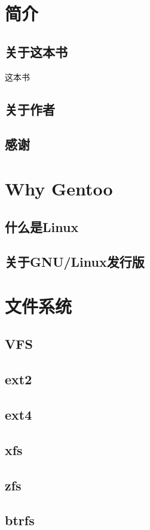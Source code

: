\chapter{简介}
\section{关于这本书}
这本书
\section{关于作者}
\section{感谢}


\chapter{Why Gentoo}
\section{什么是Linux}
\section{关于GNU/Linux发行版}

\chapter{文件系统}
\section{VFS}
\section{ext2}
\section{ext4}
\section{xfs}
\section{zfs}
\section{btrfs}


